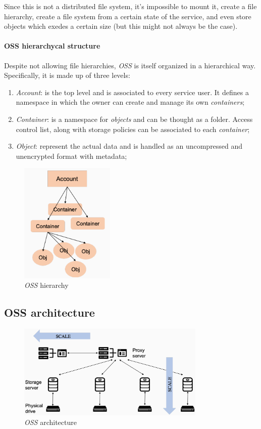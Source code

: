 Since this is not a distributed file system, it's impossible to mount it, create
a file hierarchy, create a file system from a certain state of the service, and
even store objects which exedes a certain size (but this might not always be the
case).

\paragraph{OSS hierarchycal structure}
Despite not allowing file hierarchies, \emph{OSS} is itself organized in a
hierarchical way. Specifically, it is made up of three levels:
\begin{enumerate}
    \item \emph{Account}: is the top level and is associated to every service
    user. It defines a namespace in which the owner can create and manage its
    own \emph{containers};
    \item \emph{Container}: is a namespace for \emph{objects} and can be thought
    as a folder. Access control list, along with storage policies can be
    associated to each \emph{container};
    \item \emph{Object}: represent the actual data and is handled as an
    uncompressed and unencrypted format with metadata;
\end{enumerate}

\begin{figure}[h!]
    \centering
    \includegraphics[width=0.4\textwidth]{images/oss-hierarchy.png}
    \caption{\emph{OSS} hierarchy}
\end{figure}

\subsection{OSS architecture}
\begin{figure}[h!]
    \centering
    \includegraphics[width=0.8\textwidth]{images/oss-architecture.png}
    \caption{\emph{OSS} architecture}
\end{figure}

